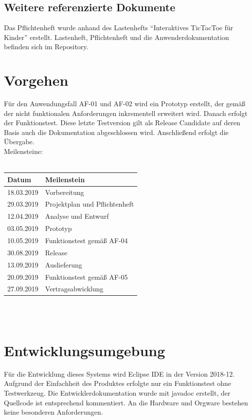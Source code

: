 \documentclass[12pt]{article}
\begin{document}
\subsection{Weitere referenzierte Dokumente}
Das Pflichtenheft wurde anhand des Lastenhefts "`Interaktives \Gls{TicTacToe} für Kinder"' erstellt. Lastenheft, Pflichtenheft und die Anwenderdokumentation befinden sich im \Gls{Repository}.
\newpage
\section{Vorgehen}
Für den Anwendungsfall AF-01 und AF-02 wird ein Prototyp erstellt, der gemäß der nicht funktionalen Anforderungen inkrementell erweitert wird. Danach erfolgt der Funktionstest. Diese letzte Testversion gilt als Release Candidate auf deren Basis auch die Dokumentation abgeschlossen wird. Anschließend erfolgt die Übergabe.\\
Meilensteine:\\\\
\begin{tabularx}{\textwidth}{|X|X|} \hline
\textbf{Datum}&\textbf{Meilenstein}\\ \hline
18.03.2019&Vorbereitung\\ \hline
29.03.2019&Projektplan und Pflichtenheft\\ \hline
12.04.2019&Analyse und Entwurf\\ \hline
03.05.2019&Prototyp\\ \hline
10.05.2019&Funktionstest gemäß AF-04\\ \hline
30.08.2019&Release\\ \hline
13.09.2019&Auslieferung\\ \hline
20.09.2019&Funktionstest gemäß AF-05\\ \hline
27.09.2019&Vertragsabwicklung\\ \hline
\end{tabularx}\\\\

\newpage


\restoregeometry

\newpage

\section{Entwicklungsumgebung}
Für die Entwicklung dieses Systems wird Eclipse IDE in der Version 2018-12. Aufgrund der Einfachheit des Produktes erfolgte nur ein Funktionstest ohne Testwerkzeug. Die Entwicklerdokumentation wurde mit javadoc erstellt, der Quellcode ist entsprechend kommentiert. An die Hardware und Orgware bestehen keine besonderen Anforderungen.

\newpage
\clearpage
\printglossaries
\end{document}
